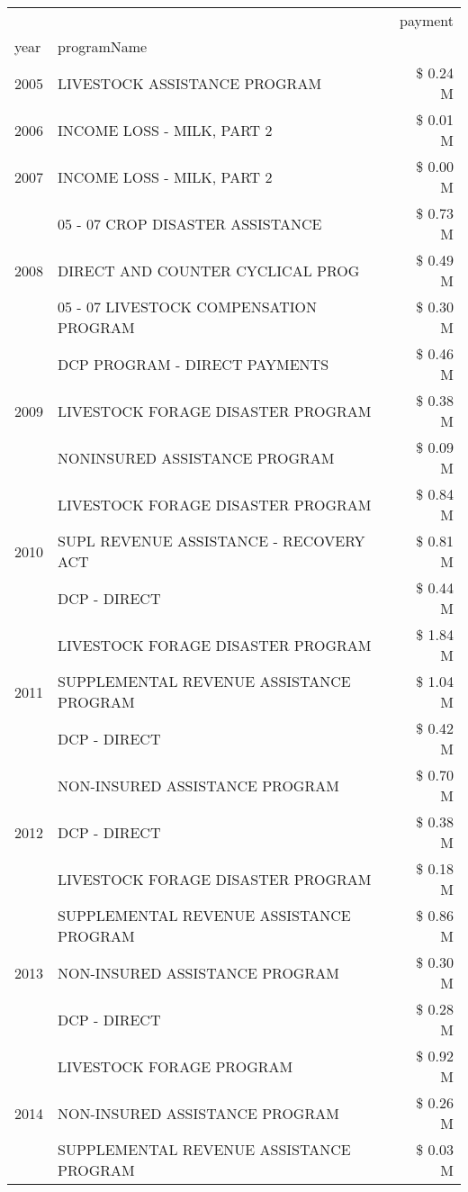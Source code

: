 \begin{tabular}{llr}
\toprule
 &  & payment \\
year & programName &  \\
\midrule
2005 & LIVESTOCK ASSISTANCE PROGRAM & \$ 0.24 M \\
\cline{1-3}
2006 & INCOME LOSS - MILK, PART 2 & \$ 0.01 M \\
\cline{1-3}
2007 & INCOME LOSS - MILK, PART 2 & \$ 0.00 M \\
\cline{1-3}
\multirow[t]{3}{*}{2008} & 05 - 07 CROP DISASTER ASSISTANCE & \$ 0.73 M \\
 & DIRECT AND COUNTER CYCLICAL PROG & \$ 0.49 M \\
 & 05 - 07 LIVESTOCK COMPENSATION PROGRAM & \$ 0.30 M \\
\cline{1-3}
\multirow[t]{3}{*}{2009} & DCP PROGRAM - DIRECT PAYMENTS & \$ 0.46 M \\
 & LIVESTOCK FORAGE DISASTER  PROGRAM & \$ 0.38 M \\
 & NONINSURED ASSISTANCE PROGRAM & \$ 0.09 M \\
\cline{1-3}
\multirow[t]{3}{*}{2010} & LIVESTOCK FORAGE DISASTER PROGRAM & \$ 0.84 M \\
 & SUPL REVENUE ASSISTANCE - RECOVERY ACT & \$ 0.81 M \\
 & DCP - DIRECT & \$ 0.44 M \\
\cline{1-3}
\multirow[t]{3}{*}{2011} & LIVESTOCK FORAGE DISASTER PROGRAM & \$ 1.84 M \\
 & SUPPLEMENTAL REVENUE ASSISTANCE PROGRAM & \$ 1.04 M \\
 & DCP - DIRECT & \$ 0.42 M \\
\cline{1-3}
\multirow[t]{3}{*}{2012} & NON-INSURED ASSISTANCE PROGRAM & \$ 0.70 M \\
 & DCP - DIRECT & \$ 0.38 M \\
 & LIVESTOCK FORAGE DISASTER PROGRAM & \$ 0.18 M \\
\cline{1-3}
\multirow[t]{3}{*}{2013} & SUPPLEMENTAL REVENUE ASSISTANCE PROGRAM & \$ 0.86 M \\
 & NON-INSURED ASSISTANCE PROGRAM & \$ 0.30 M \\
 & DCP - DIRECT & \$ 0.28 M \\
\cline{1-3}
\multirow[t]{3}{*}{2014} & LIVESTOCK FORAGE PROGRAM & \$ 0.92 M \\
 & NON-INSURED ASSISTANCE PROGRAM & \$ 0.26 M \\
 & SUPPLEMENTAL REVENUE ASSISTANCE PROGRAM & \$ 0.03 M \\
\cline{1-3}

\end{tabular}
